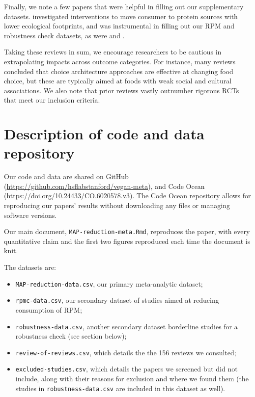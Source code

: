 \documentclass[sn-nature,referee,lineno,pdflatex]{sn-jnl}
\begin{document}
Finally, we note a few papers that were helpful in filling out our
supplementary datasets. \citep{ronto2022} investigated interventions to
move consumer to protein sources with lower ecological footprints, and
was instrumental in filling out our RPM and robustness check datasets,
as were \citep{kwasny2022} and \citep{grummon2023}.

Taking these reviews in sum, we encourage researchers to be cautious in
extrapolating impacts across outcome categories. For instance, many
reviews concluded that choice architecture approaches are effective at
changing food choice, but these are typically aimed at foods with weak
social and cultural associations. We also note that prior reviews vastly
outnumber rigorous RCTs that meet our inclusion criteria.

\section{Description of code and data
repository}\label{description-of-code-and-data-repository}

Our code and data are shared on GitHub
(\url{https://github.com/hsflabstanford/vegan-meta}), and Code Ocean
(\url{https://doi.org/10.24433/CO.6020578.v3}). The Code Ocean
repository allows for reproducing our papers' results without
downloading any files or managing software versions.

Our main document, \texttt{MAP-reduction-meta.Rmd}, reproduces the
paper, with every quantitative claim and the first two figures
reproduced each time the document is knit.

The datasets are:

\begin{itemize}
\item
  \texttt{MAP-reduction-data.csv}, our primary meta-analytic dataset;
\item
  \texttt{rpmc-data.csv}, our secondary dataset of studies aimed at
  reducing consumption of RPM;
\item
  \texttt{robustness-data.csv}, another secondary dataset borderline
  studies for a robustness check (see section below);
\item
  \texttt{review-of-reviews.csv}, which details the the 156 reviews we
  consulted;
\item
  \texttt{excluded-studies.csv}, which details the papers we screened
  but did not include, along with their reasons for exclusion and where
  we found them (the studies in \texttt{robustness-data.csv} are
  included in this dataset as well).
\end{itemize}
\end{document}

